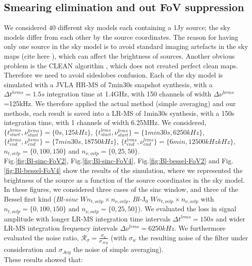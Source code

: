 \documentclass[useAMS,usenatbib]{mn2e}
\begin{document}
\subsection{Smearing elimination and out FoV suppression}
We considered $40$ different sky models each  containing a 1Jy source; the sky models differ from each other by the source coordinates. 
The reason for having  only one source in the sky model is to avoid standard imaging artefacts in the sky maps (cite here \cite{2}), which 
can affect the brightness of sources. Another obvious problem is the  CLEAN algorithm \citep{cornwell1999deconvolution}, which does not 
created 
perfect clean maps. Therefore we need to avoid sideslobes confusion. Each of the sky model is simulated 
with a JVLA HR-MS of 7min30s snapshot synthesis, with a $\Delta t^{hrms}=1.5s$ integration 
time at 1.4GHz,  with 150 channels of width $\Delta \nu^{hrms}$=125kHz. We therefore applied the actual method (simple averaging) and 
our methods, each result is saved into a LR-MS of 1min30s synthesis, with a 150s integration time,  with 1 channels of width 6.25MHz. We 
considered, $\{t^{hrms}_{start},\nu^{hrms}_{start}\}=\{0s,125kHz\}$, $\{t^{lrms}_{start},\nu^{lrms}_{start}\}=\{1min30s,6250kHz\}$, 
$\{t^{hrms}_{end},\nu^{hrms}_{end}\}=\{7min30s,18750kHz\}$, $\{t^{lrms}_{end},\nu^{lrms}_{end}\}=\{6min,12500kHzkHz\}$, 
$n_{t,ovlp}=\{0,100,150\}$ 
and $n_{\nu,ovlp}=\{0,25,50\}$.\\
Fig.\ref{fig:Bl-sinc-FoV2}, Fig.\ref{fig:Bl-sinc-FoV4}, Fig.\ref{fig:Bl-bessel-FoV2} and Fig.\ref{fig:Bl-bessel-FoV4} show the results of 
the simulation, where we represented the brightness of the source as a function of the source coordinates in the sky model. In these 
figures, we 
considered three cases of the sinc window, and three of the Bessel first kind ($Bl$-$sinc$ $W n_{t,ovlp} \times n_{\nu,ovlp}$, $Bl$-J$_0$ 
$W n_{t,ovlp} \times n_{\nu,ovlp}$ with  $n_{t,ovlp}=\{0,100,150\}$ and $n_{\nu,ovlp}=\{0,25,50\}$). We evaluated the loss in signal 
amplitude with longer LR-MS integration time intervals $\Delta t^{lrms}=150s$ and wider LR-MS integration frequency intervals $\Delta 
\nu^{lrms}=6250kHz$. We furthermore evaluated the  noise ratio, $\mathcal{R}_{\sigma}=\frac{\sigma_{w}}{\sigma_{Avg}}$ (with $\sigma_{w}$  
the resulting noise of the filter under consideration and $\sigma_{Avg}$ the noise of simple averaging).\\
These results showed that:
\end{document}
